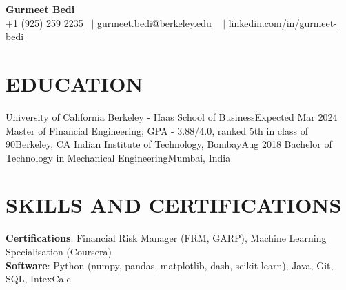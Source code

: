 

\begin{center}
    {\Huge  \textbf{Gurmeet Bedi}} \\ \vspace{1pt}
    \small  \href{tel:19252592235}{+1 (925) 259 2235}  ~$\mid$ \href{mailto:gurmeet.bedi@berkeley.edu}{ gurmeet.bedi@berkeley.edu} ~ $\mid$ \href{https://www.linkedin.com/in/gurmeet-bedi/}{ linkedin.com/in/gurmeet-bedi} 
    \\
    \vspace{1pt}
    \vspace{-8pt}
\end{center}


\section{EDUCATION}
  \resumeSubHeadingListStart
  \resumeSubheading
      {University of California Berkeley - Haas School of Business}{Expected Mar 2024}
      {Master of Financial Engineering; GPA - 3.88/4.0, ranked 5th in class of 90}{Berkeley, CA}{}
    \resumeSubheading
      {Indian Institute of Technology, Bombay}{Aug 2018}
      {Bachelor of Technology in Mechanical Engineering}{Mumbai, India}{}
    \resumeItemListStart
    \resumeItemListEnd
  \resumeSubHeadingListEnd


\section{SKILLS AND CERTIFICATIONS}
 \begin{itemize}[leftmargin=0.00in, label={}]
    \small{\item{
    \textbf{Certifications}{: Financial Risk Manager (FRM, GARP), Machine Learning Specialisation (Coursera)} \\
     \textbf{Software}{: 
     Python (numpy, pandas, matplotlib, dash, scikit-learn), 
     Java, 
     Git, 
     SQL, 
     IntexCalc
     }}}
 \end{itemize}
 \vspace{-16pt}

